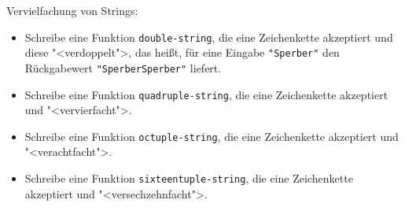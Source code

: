 \begin{aufgabe}
 Vervielfachung von Strings:
 \begin{itemize}
  \item Schreibe eine Funktion \lstinline{double-string}, die eine Zeichenkette akzeptiert und
    diese "<verdoppelt">, das heißt, für eine Eingabe \lstinline{"Sperber"} den
    Rückgabewert \lstinline{"SperberSperber"} liefert.
    
  \item Schreibe eine Funktion \lstinline{quadruple-string}, die eine
    Zeichenkette akzeptiert und "<vervierfacht">.

  \item Schreibe eine Funktion \lstinline{octuple-string}, die eine
    Zeichenkette akzeptiert und "<verachtfacht">.

  \item Schreibe eine Funktion \lstinline{sixteentuple-string}, die
    eine Zeichenkette akzeptiert und "<versechzehnfacht">.
  \end{itemize}


\end{aufgabe}

